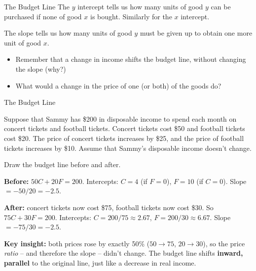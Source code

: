 \documentclass{beamer}
\begin{document}
\begin{frame}{The Budget Line}
  The $y$ intercept tells us how many units of good $y$ can be purchased if none of good $x$ is bought. Similarly for the $x$ intercept.
  
  \bigskip
  The slope tells us how many units of good $y$ must be given up to obtain one more unit of good $x$.

  \bigskip
  \begin{itemize}
    \item Remember that a change in income shifts the budget line, without changing the slope (why?)
    
    \item What would a change in the price of one (or both) of the goods do?
  \end{itemize}
\end{frame}

\begin{frame}{The Budget Line}
  
  \bigskip
  Suppose that Sammy has \$200 in disposable income to spend each month on concert tickets and football tickets. Concert tickets cost \$50 and football tickets cost \$20. The price of concert tickets increases by \$25, and the price of football tickets increases by \$10. Assume that Sammy's disposable income doesn't change. 
  
  \bigskip
  Draw the budget line before and after. 
\end{frame}

\begin{frame}

  \bigskip
  \textbf{Before:} $50C + 20F = 200$. Intercepts: $C = 4$ (if $F=0$), $F = 10$ (if $C=0$). Slope $= -50/20 = -2.5$.

  \bigskip
  \textbf{After:} concert tickets now cost \$75, football tickets now cost \$30. So $75C + 30F = 200$. Intercepts: $C = 200/75 \approx 2.67$, $F = 200/30 \approx 6.67$. Slope $= -75/30 = -2.5$.

  \bigskip
  \textbf{Key insight:} both prices rose by exactly 50\% ($50\to75$, $20\to30$), so the price \emph{ratio} -- and therefore the slope -- didn't change. The budget line shifts \textbf{inward, parallel} to the original line, just like a decrease in real income.
\end{frame}
\end{document}
